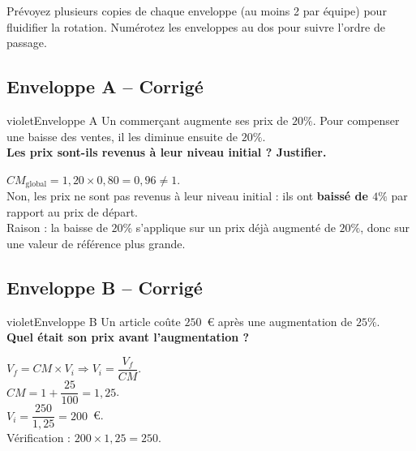 \documentclass[12pt,a4paper]{article}
\begin{document}
\vspace{0.5cm}

\begin{conseil}
Prévoyez plusieurs copies de chaque enveloppe (au moins 2 par équipe) pour fluidifier la rotation. Numérotez les enveloppes au dos pour suivre l'ordre de passage.
\end{conseil}

\newpage


\subsection*{Enveloppe A -- Corrigé}

\begin{carte}{violet}{Enveloppe A}
Un commerçant augmente ses prix de \(20\%\). Pour compenser une baisse des ventes, il les diminue ensuite de \(20\%\).\\[0.3cm]
\textbf{Les prix sont-ils revenus à leur niveau initial ? Justifier.}
\end{carte}
\begin{corrige}
\(CM_{\text{global}} = 1{,}20 \times 0{,}80 = 0{,}96 \neq 1\).\\[0.2cm]
Non, les prix ne sont pas revenus à leur niveau initial : ils ont \textbf{baissé de \(4\%\)} par rapport au prix de départ.\\[0.2cm]
Raison : la baisse de \(20\%\) s'applique sur un prix déjà augmenté de \(20\%\), donc sur une valeur de référence plus grande.
\end{corrige}

\subsection*{Enveloppe B -- Corrigé}

\begin{carte}{violet}{Enveloppe B}
Un article coûte \(250\)~\euro{} après une augmentation de \(25\%\).\\[0.3cm]
\textbf{Quel était son prix avant l'augmentation ?}
\end{carte}
\begin{corrige}
\(V_f = CM \times V_i \Rightarrow V_i = \dfrac{V_f}{CM}\).\\[0.2cm]
\(CM = 1 + \dfrac{25}{100} = 1{,}25\).\\[0.2cm]
\(V_i = \dfrac{250}{1{,}25} = 200\)~\euro{}.\\[0.2cm]
Vérification : \(200 \times 1{,}25 = 250\).
\end{corrige}
\end{document}
